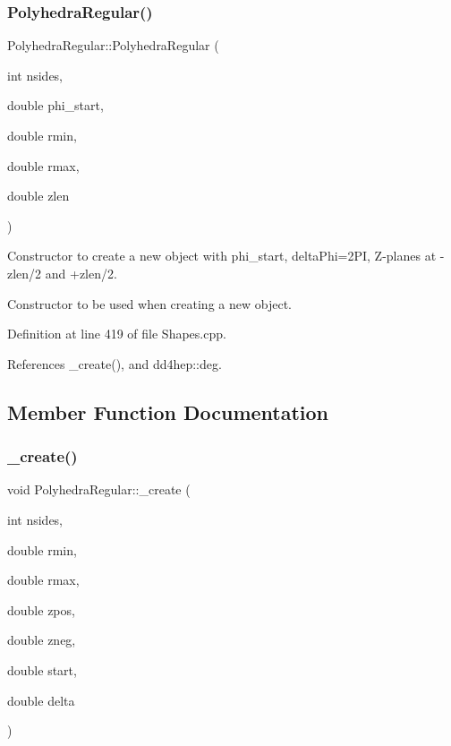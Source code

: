 \subsubsection{\texorpdfstring{Polyhedra\+Regular()}{PolyhedraRegular()}\hspace{0.1cm}{\footnotesize\ttfamily [7/7]}}
{\footnotesize\ttfamily Polyhedra\+Regular\+::\+Polyhedra\+Regular (\begin{DoxyParamCaption}\item[{int}]{nsides,  }\item[{double}]{phi\+\_\+start,  }\item[{double}]{rmin,  }\item[{double}]{rmax,  }\item[{double}]{zlen }\end{DoxyParamCaption})}



Constructor to create a new object with phi\+\_\+start, delta\+Phi=2\+PI, Z-\/planes at -\/zlen/2 and +zlen/2. 

Constructor to be used when creating a new object. 

Definition at line 419 of file Shapes.\+cpp.



References \+\_\+create(), and dd4hep\+::deg.



\subsection{Member Function Documentation}
\hypertarget{class_d_d4hep_1_1_geometry_1_1_polyhedra_regular_add1de904bca13df6b2b5e938e1afb7d8}{}\label{class_d_d4hep_1_1_geometry_1_1_polyhedra_regular_add1de904bca13df6b2b5e938e1afb7d8} 
\subsubsection{\texorpdfstring{\+\_\+create()}{\_create()}}
{\footnotesize\ttfamily void Polyhedra\+Regular\+::\+\_\+create (\begin{DoxyParamCaption}\item[{int}]{nsides,  }\item[{double}]{rmin,  }\item[{double}]{rmax,  }\item[{double}]{zpos,  }\item[{double}]{zneg,  }\item[{double}]{start,  }\item[{double}]{delta }\end{DoxyParamCaption})\hspace{0.3cm}{\ttfamily [protected]}}



